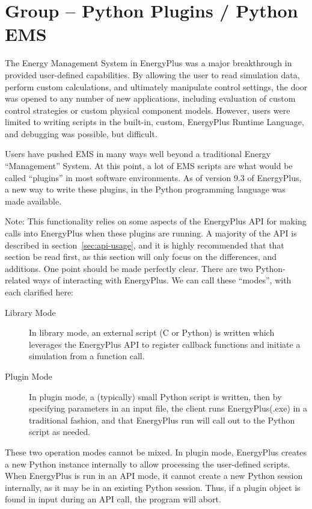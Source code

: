 \section{Group -- Python Plugins / Python EMS}\label{group-plugins}

The Energy Management System in EnergyPlus was a major breakthrough in provided user-defined capabilities.
By allowing the user to read simulation data, perform custom calculations, and ultimately manipulate control settings, the door was opened to any number of new applications, including evaluation of custom control strategies or custom physical component models.
However, users were limited to writing scripts in the built-in, custom, EnergyPlus Runtime Language, and debugging was possible, but difficult.

Users have pushed EMS in many ways well beyond a traditional Energy ``Management'' System.
At this point, a lot of EMS scripts are what would be called ``plugins'' in most software environments.
As of version 9.3 of EnergyPlus, a new way to write these plugins, in the Python programming language was made available.

Note: This functionality relies on some aspects of the EnergyPlus API for making calls into EnergyPlus when these plugins are running.
A majority of the API is described in section~\ref{sec:api-usage}, and it is highly recommended that that section be read first, as this section will only focus on the differences, and additions.
One point should be made perfectly clear.
There are two Python-related ways of interacting with EnergyPlus.
We can call these ``modes'', with each clarified here:

\begin{description}
    \item[Library Mode] In library mode, an external script (C or Python) is written which leverages the EnergyPlus API to register callback functions and initiate a simulation from a function call.
    \item[Plugin Mode] In plugin mode, a (typically) small Python script is written, then by specifying parameters in an input file, the client runs EnergyPlus(.exe) in a traditional fashion, and that EnergyPlus run will call out to the Python script as needed.
\end{description}

These two operation modes cannot be mixed.
In plugin mode, EnergyPlus creates a new Python instance internally to allow processing the user-defined scripts.
When EnergyPlus is run in an API mode, it cannot create a new Python session internally, as it may be in an existing Python session.
Thus, if a plugin object is found in input during an API call, the program will abort.

